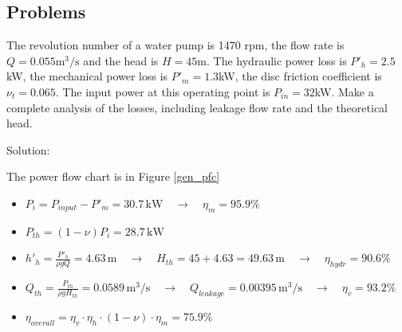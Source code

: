 \newpage
\subsection{Problems}


\begin{tcolorbox}

The revolution number of a water pump is 1470 rpm, the flow rate is $Q=0.055\mathrm{m^3/s}$ and the head is $H=45$m. The hydraulic power loss is $P'_h=2.5$kW, the mechanical power loss is $P'_m=1.3$kW, the disc friction coefficient is $\nu_t=0.065$. The input power at this operating point is $P_{in}=32$kW. Make a complete analysis of the losses, including leakage flow rate and the theoretical head.

\noindent Solution:

The power flow chart is in Figure \ref{gen_pfc}

\begin{itemize}
\item $P_{i}=P_{input}-P'_{m}=30.7\,\mathrm{kW}\quad \rightarrow \quad \eta_{m}=95.9\%$
\item $P_{th}=(1-\nu)P_{i}=28.7\,\mathrm{kW}$
\item $h'_{h}=\frac{P'_{h}}{\rho g Q}=4.63\,\mathrm{m} \quad \rightarrow \quad H_{th}=45+4.63=49.63\,\mathrm{m}\quad \rightarrow \quad \eta_{hydr}=90.6\%$
\item $Q_{th}=\frac{P_{th}}{\rho g H_{th}}=0.0589\,\mathrm{m^3/s}\quad \rightarrow \quad Q_{leakage}=0.00395\,\mathrm{m^3/s}\quad \rightarrow \quad \eta_{v}=93.2\%$ 
\item $\eta_{overall}=\eta_{v} \cdot\eta_{h} \cdot (1-\nu) \cdot \eta_{m} = 75.9\%$
\end{itemize}
\end{tcolorbox}
\vspace{1cm}

